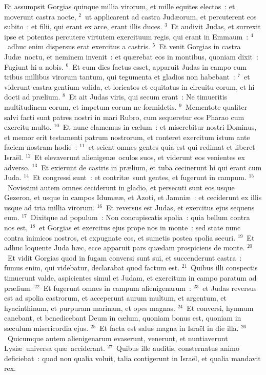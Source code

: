 \lettrine[lines=3,image=true,loversize=0.05,lraise=-0.03]{E}{}t assumpsit Gorgias quinque millia virorum, et mille equites electos~: et moverunt castra nocte,
${}^{2}$~ut applicarent ad castra Jud\ae orum, et percuterent eos subito~: et filii, qui erant ex arce, erant illis duces.
${}^{3}$~Et audivit Judas, et surrexit ipse et potentes percutere virtutem exercituum regis, qui erant in Emmaum~:
${}^{4}$~adhuc enim dispersus erat exercitus a castris.
${}^{5}$~Et venit Gorgias in castra Jud\ae\ noctu, et neminem invenit~: et qu\ae rebat eos in montibus, quoniam dixit~: Fugiunt hi a nobis.
${}^{6}$~Et cum dies factus esset, apparuit Judas in campo cum tribus millibus virorum tantum, qui tegumenta et gladios non habebant~:
${}^{7}$~et viderunt castra gentium valida, et loricatos et equitatus in circuitu eorum, et hi docti ad pr\ae lium.
${}^{8}$~Et ait Judas viris, qui secum erant~: Ne timueritis multitudinem eorum, et impetum eorum ne formidetis.
${}^{9}$~Mementote qualiter salvi facti sunt patres nostri in mari Rubro, cum sequeretur eos Pharao cum exercitu multo.
${}^{10}$~Et nunc clamemus in c\ae lum~: et miserebitur nostri Dominus, et memor erit testamenti patrum nostrorum, et conteret exercitum istum ante faciem nostram hodie~:
${}^{11}$~et scient omnes gentes quia est qui redimat et liberet Isra\"el.
${}^{12}$~Et elevaverunt alienigen\ae\ oculos suos, et viderunt eos venientes ex adverso.
${}^{13}$~Et exierunt de castris in pr\ae lium, et tuba cecinerunt hi qui erant cum Juda.
${}^{14}$~Et congressi sunt~: et contrit\ae\ sunt gentes, et fugerunt in campum.
${}^{15}$~Novissimi autem omnes ceciderunt in gladio, et persecuti sunt eos usque Gezeron, et usque in campos Idum\ae \ae , et Azoti, et Jamni\ae~: et ceciderunt ex illis usque ad tria millia virorum.
${}^{16}$~Et reversus est Judas, et exercitus ejus sequens eum.
${}^{17}$~Dixitque ad populum~: Non concupiscatis spolia~: quia bellum contra nos est,
${}^{18}$~et Gorgias et exercitus ejus prope nos in monte~: sed state nunc contra inimicos nostros, et expugnate eos, et sumetis postea spolia securi.
${}^{19}$~Et adhuc loquente Juda h\ae c, ecce apparuit pars qu\ae dam prospiciens de monte.
${}^{20}$~Et vidit Gorgias quod in fugam conversi sunt sui, et succenderunt castra~: fumus enim, qui videbatur, declarabat quod factum est.
${}^{21}$~Quibus illi conspectis timuerunt valde, aspicientes simul et Judam, et exercitum in campo paratum ad pr\ae lium.
${}^{22}$~Et fugerunt omnes in campum alienigenarum~:
${}^{23}$~et Judas reversus est ad spolia castrorum, et acceperunt aurum multum, et argentum, et hyacinthinum, et purpuram marinam, et opes magnas.
${}^{24}$~Et conversi, hymnum canebant, et benedicebant Deum in c\ae lum, quoniam bonus est, quoniam in s\ae culum misericordia ejus.
${}^{25}$~Et facta est salus magna in Isra\"el in die illa.
${}^{26}$~Quicumque autem alienigenarum evaserunt, venerunt, et nuntiaverunt Lysi\ae\ universa qu\ae\ acciderant.
${}^{27}$~Quibus ille auditis, consternatus animo deficiebat~: quod non qualia voluit, talia contigerunt in Isra\"el, et qualia mandavit rex.


